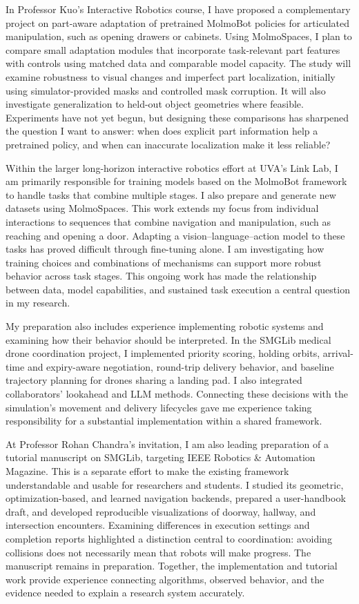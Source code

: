 \documentclass[11pt,letterpaper]{article}
\begin{document}
In Professor Kuo's Interactive Robotics course, I have proposed a complementary project on part-aware adaptation of pretrained MolmoBot policies for articulated manipulation, such as opening drawers or cabinets. Using MolmoSpaces, I plan to compare small adaptation modules that incorporate task-relevant part features with controls using matched data and comparable model capacity. The study will examine robustness to visual changes and imperfect part localization, initially using simulator-provided masks and controlled mask corruption. It will also investigate generalization to held-out object geometries where feasible. Experiments have not yet begun, but designing these comparisons has sharpened the question I want to answer: when does explicit part information help a pretrained policy, and when can inaccurate localization make it less reliable?

Within the larger long-horizon interactive robotics effort at UVA's Link Lab, I am primarily responsible for training models based on the MolmoBot framework to handle tasks that combine multiple stages. I also prepare and generate new datasets using MolmoSpaces. This work extends my focus from individual interactions to sequences that combine navigation and manipulation, such as reaching and opening a door. Adapting a vision--language--action model to these tasks has proved difficult through fine-tuning alone. I am investigating how training choices and combinations of mechanisms can support more robust behavior across task stages. This ongoing work has made the relationship between data, model capabilities, and sustained task execution a central question in my research.

My preparation also includes experience implementing robotic systems and examining how their behavior should be interpreted. In the SMGLib medical drone coordination project, I implemented priority scoring, holding orbits, arrival-time and expiry-aware negotiation, round-trip delivery behavior, and baseline trajectory planning for drones sharing a landing pad. I also integrated collaborators' lookahead and LLM methods. Connecting these decisions with the simulation's movement and delivery lifecycles gave me experience taking responsibility for a substantial implementation within a shared framework.

At Professor Rohan Chandra's invitation, I am also leading preparation of a tutorial manuscript on SMGLib, targeting IEEE Robotics \& Automation Magazine. This is a separate effort to make the existing framework understandable and usable for researchers and students. I studied its geometric, optimization-based, and learned navigation backends, prepared a user-handbook draft, and developed reproducible visualizations of doorway, hallway, and intersection encounters. Examining differences in execution settings and completion reports highlighted a distinction central to coordination: avoiding collisions does not necessarily mean that robots will make progress. The manuscript remains in preparation. Together, the implementation and tutorial work provide experience connecting algorithms, observed behavior, and the evidence needed to explain a research system accurately.
\end{document}
